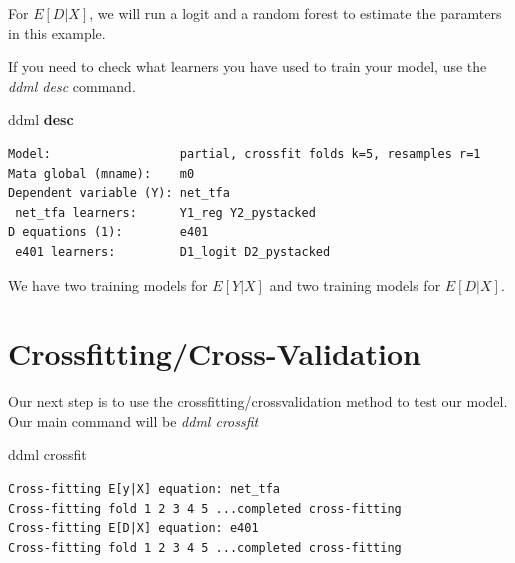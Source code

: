 \documentclass[
]{book}
\newenvironment{Shaded}{\begin{snugshade}}{\end{snugshade}}
\newcommand{\DecValTok}[1]{\textcolor[rgb]{0.00,0.00,0.81}{#1}}
\newcommand{\KeywordTok}[1]{\textcolor[rgb]{0.13,0.29,0.53}{\textbf{#1}}}
\newcommand{\NormalTok}[1]{#1}
\newcommand{\OtherTok}[1]{\textcolor[rgb]{0.56,0.35,0.01}{#1}}
\begin{document}
For \(E[D|X]\), we will run a logit and a random forest to estimate the paramters in this example.

\begin{Shaded}
\end{Shaded}

If you need to check what learners you have used to train your model, use the \emph{ddml desc} command.

\begin{Shaded}
\begin{Highlighting}[]
\NormalTok{ddml }\KeywordTok{desc}
\end{Highlighting}
\end{Shaded}

\begin{verbatim}
Model:                  partial, crossfit folds k=5, resamples r=1
Mata global (mname):    m0
Dependent variable (Y): net_tfa
 net_tfa learners:      Y1_reg Y2_pystacked
D equations (1):        e401
 e401 learners:         D1_logit D2_pystacked
\end{verbatim}

We have two training models for \(E[Y|X]\) and two training models for \(E[D|X]\).

\section{Crossfitting/Cross-Validation}\label{crossfittingcross-validation}

Our next step is to use the crossfitting/crossvalidation method to test our model. Our main command will be \emph{ddml crossfit}

\begin{Shaded}
\begin{Highlighting}[]
\NormalTok{ddml crossfit}
\end{Highlighting}
\end{Shaded}

\begin{verbatim}
Cross-fitting E[y|X] equation: net_tfa
Cross-fitting fold 1 2 3 4 5 ...completed cross-fitting
Cross-fitting E[D|X] equation: e401
Cross-fitting fold 1 2 3 4 5 ...completed cross-fitting
\end{verbatim}
\end{document}
